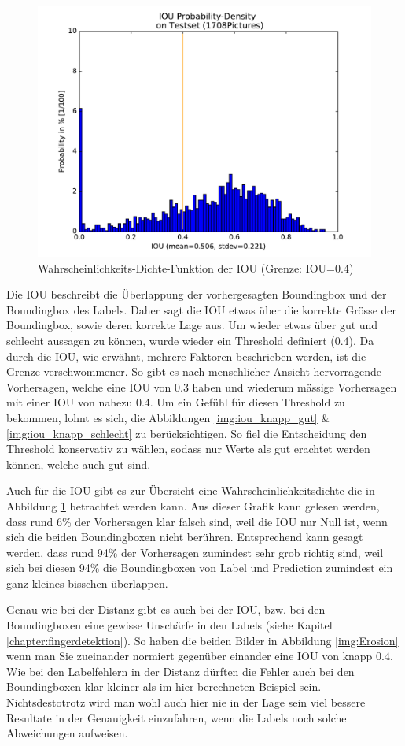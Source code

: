 \begin{figure}
	\centering
	\includegraphics[width=.7\textwidth]{Kapitel/70Resultate/Bilder/IOUprobDensity.pdf}
	\caption{Wahrscheinlichkeits-Dichte-Funktion der IOU (Grenze: IOU=0.4)}
	\label{img:iou_dichte}
\end{figure}


Die IOU beschreibt die Überlappung der vorhergesagten Boundingbox und der Boundingbox des Labels. 
Daher sagt die IOU etwas über die korrekte Grösse der Boundingbox, sowie deren korrekte Lage aus. 
Um wieder etwas über gut und schlecht aussagen zu können, wurde wieder ein Threshold definiert (0.4).
Da durch die IOU, wie erwähnt, mehrere Faktoren beschrieben werden, ist die Grenze verschwommener. 
So gibt es nach menschlicher Ansicht hervorragende Vorhersagen, welche eine IOU von 0.3 haben und wiederum mässige Vorhersagen mit einer IOU von nahezu 0.4.
Um ein Gefühl für diesen Threshold zu bekommen, lohnt es sich, die Abbildungen \ref{img:iou_knapp_gut} \& \ref{img:iou_knapp_schlecht} zu berücksichtigen.
So fiel die Entscheidung den Threshold konservativ zu wählen, sodass nur Werte als gut erachtet werden können, welche auch gut sind. 

Auch für die IOU gibt es zur Übersicht eine Wahrscheinlichkeitsdichte die in Abbildung \ref{img:iou_dichte} betrachtet werden kann.
Aus dieser Grafik kann gelesen werden, dass rund 6\% der Vorhersagen klar falsch sind, weil die IOU nur Null ist, wenn sich die beiden Boundingboxen nicht berühren. Entsprechend kann gesagt werden, dass rund 94\% der Vorhersagen zumindest sehr grob richtig sind, weil sich bei diesen 94\% die Boundingboxen von Label und Prediction zumindest ein ganz kleines bisschen überlappen. 

Genau wie bei der Distanz gibt es auch bei der IOU, bzw. bei den Boundingboxen eine gewisse Unschärfe in den Labels (siehe Kapitel \ref{chapter:fingerdetektion}).
So haben die beiden Bilder in Abbildung \ref{img:Erosion} wenn man Sie zueinander normiert gegenüber einander eine IOU von knapp $0.4$.
Wie bei den Labelfehlern in der Distanz dürften die Fehler auch bei den Boundingboxen klar kleiner als im hier berechneten Beispiel sein.
Nichtsdestotrotz wird man wohl auch hier nie in der Lage sein viel bessere Resultate in der Genauigkeit einzufahren, wenn die Labels noch solche Abweichungen aufweisen.

